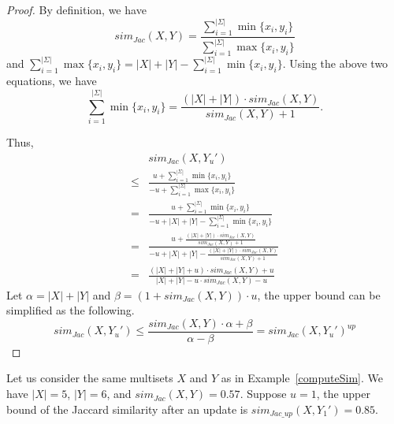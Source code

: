 \begin{proof}
By definition, we have $$sim_{Jac}(X, Y) = \frac{\sum_{i=1}^{|\Sigma|} \min\{x_i, y_i\}}{\sum_{i=1}^{|\Sigma|} \max\{x_i, y_i\}}$$ and $\sum_{i=1}^{|\Sigma|} \max\{x_i, y_i\}=|X|+|Y|- \sum_{i=1}^{|\Sigma|} \min\{x_i, y_i\}$. Using the above two equations, we have $$\sum_{i=1}^{|\Sigma|} \min\{x_i, y_i\} =\frac{(|X|+|Y|)\cdot sim_{Jac}(X, Y)}{sim_{Jac}(X, Y)+1}.$$ 

Thus, 
\begin{align*}
& sim_{Jac}(X, Y_u') \\
\leq & \frac{u+\sum_{i=1}^{|\Sigma|} \min\{x_i, y_i\}}{-u+\sum_{i=1}^{|\Sigma|} \max\{x_i, y_i\}} \\
= & \frac{u+\sum_{i=1}^{|\Sigma|} \min\{x_i, y_i\}}{-u+|X|+|Y|-\sum_{i=1}^{|\Sigma|} \min\{x_i, y_i\}} \\
= & \frac{u+\frac{(|X|+|Y|)\cdot sim_{Jac}(X, Y)}{sim_{Jac}(X, Y)+1}}{-u+|X|+|Y|-\frac{(|X|+|Y|)\cdot sim_{Jac}(X, Y)}{sim_{Jac}(X, Y)+1}} \\
= & \frac{(|X|+|Y|+u)\cdot sim_{Jac}(X, Y)+u}{|X|+|Y|-u\cdot sim_{Jac}(X, Y)-u} 
\end{align*}
Let $\alpha = |X| + |Y|$ and $\beta = (1+sim_{Jac}(X, Y))\cdot u$, the upper bound can be simplified as the following.
$$sim_{Jac}(X, Y_u') \leq \frac{sim_{Jac}(X, Y)\cdot \alpha+\beta}{\alpha-\beta} = sim_{Jac}(X, Y_u')^{up}$$ 
\end{proof}

\begin{example} 
Let us consider the same multisets $X$ and $Y$ as in Example~\ref{computeSim}. We have $|X|=5$, $|Y|=6$, and $sim_{Jac}(X, Y) = 0.57$. Suppose $u=1$, the upper bound of the Jaccard similarity after an update is $sim_{Jac\_up}(X, Y_1') = 0.85$.
\end{example}



